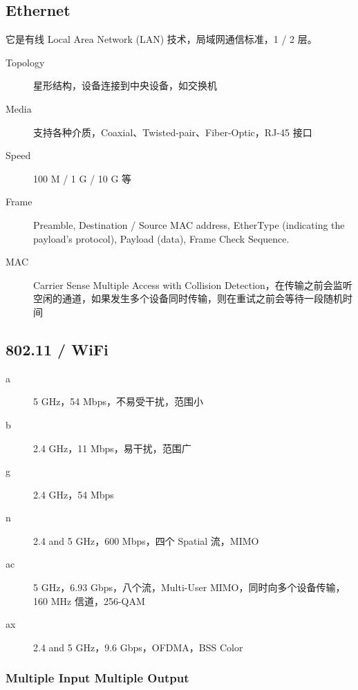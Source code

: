 \documentclass[11pt,journal,compsoc]{IEEEtran}
\begin{document}
\subsection{Ethernet}

它是有线 Local Area Network (LAN) 技术，局域网通信标准，1 / 2 层。

\begin{description}
    \item[Topology] 星形结构，设备连接到中央设备，如交换机

    \item[Media] 支持各种介质，Coaxial、Twisted-pair、Fiber-Optic，RJ-45 接口

    \item[Speed] 100 M / 1 G / 10 G 等

    \item[Frame] Preamble, Destination / Source MAC address, EtherType (indicating the payload's protocol), Payload (data), Frame Check Sequence.

    \item[MAC] Carrier Sense Multiple Access with Collision Detection，在传输之前会监听空闲的通道，如果发生多个设备同时传输，则在重试之前会等待一段随机时间
\end{description}


\subsection{802.11 / WiFi}

\begin{description}
    \item[a] 5 GHz，54 Mbps，不易受干扰，范围小

    \item[b] 2.4 GHz，11 Mbps，易干扰，范围广

    \item[g] 2.4 GHz，54 Mbps

    \item[n] 2.4 and 5 GHz，600 Mbps，四个 Spatial 流，MIMO

    \item[ac] 5 GHz，6.93 Gbps，八个流，Multi-User MIMO，同时向多个设备传输，160 MHz 信道，256-QAM

    \item[ax] 2.4 and 5 GHz，9.6 Gbps，OFDMA，BSS Color
\end{description}


\subsubsection{Multiple Input Multiple Output}
\end{document}

